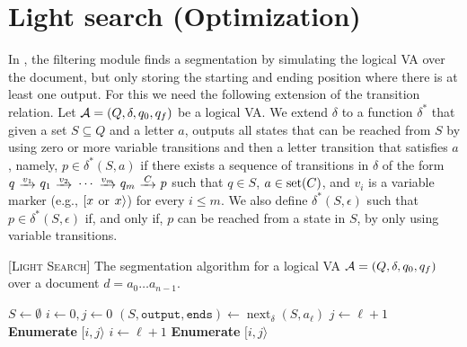 
\section{Light search (Optimization)}

In \rematch, the filtering module finds a segmentation by simulating the logical
VA over the document, but only storing the starting and ending position where
there is at least one output. For this we need the following extension of the
transition relation. Let $\mathcal{A} = (Q, \delta, q_0, q_f)$ be a logical VA. We
extend $\delta$ to a function $\delta^*$ that given a set $S \subseteq Q$ and a
letter $a$, outputs all states that can be reached from $S$ by using zero or
more variable transitions and then a letter transition that satisfies $a$,
namely, $p \in \delta^*(S,a)$ if there exists a sequence of transitions in
$\delta$ of the form
$
	q \ \trans{v_1} \ q_1 \ \trans{v_2} \ \cdots \ \trans{v_m} \ q_m \ \trans{C} \ p
$
such that $q \in S$, $a \in \operatorname{set}(C)$, and $v_i$ is a variable marker (e.g.,
$[ x$ or $x \rangle$) for every $i \leq m$. We also define
$\delta^*(S,\epsilon)$ such that $p \in \delta^*(S,\epsilon)$ if, and only if,
$p$ can be reached from a state in $S$, by only using variable transitions.

\newcommand{\foutput}{\texttt{output}} \newcommand{\fends}{\texttt{ends}}
\newcommand{\fnext}{\operatorname{next}_{\delta}}



\begin{algorithm}[t]
	\caption{[\textsc{Light Search}] The segmentation algorithm for a logical VA
	$\mathcal{A} = (Q, \delta, q_0, q_f)$ over a document $d = a_0 \ldots
	a_{n-1}$.}\label{alg:segmentation}
	\begin{algorithmic}[1]
		 \State $S \gets
		\emptyset$ \State $i \gets 0, j \gets 0$ 
		\State $(S, \foutput, \fends) \gets \fnext(S, a_\ell)$ \If{$\foutput$}
		\State $j \gets \ell+1$ \ElsIf{$\fends$}  \State
		\textbf{Enumerate} $[i, j\rangle$ \EndIf \State $i \gets \ell + 1$
		\EndIf \EndFor {} \State \textbf{Enumerate} $[i, j\rangle$
		\EndIf \EndProcedure
	\end{algorithmic}
\end{algorithm}

